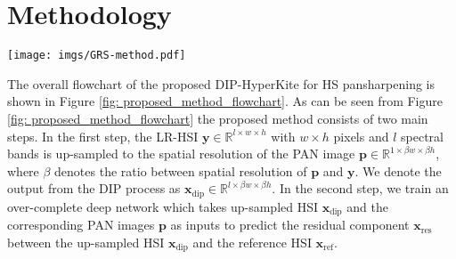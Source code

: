 \documentclass[journal]{IEEEtran}
\begin{document}
\section{Methodology}
\label{sec: method}
\label{proposed_method}
\begin{figure*}[tb!]
        \centering
        \texttt{[image: imgs/GRS-method.pdf]}
        \caption{The overall flowchart of our proposed DIP-HyperKite for HS pansharpening. In the first step, we up-sample the LR-HSI $\mathbf{y}$ via DIP process to obtain the up-sampled HSI $\mathbf{x}_{\text{dip}}$. The DIP process takes a fixed noise tensor $\mathbf{z}$ as input for a given LR-HSI $\mathbf{y}$, and produces the up-sampled HSI $\mathbf{x}_{\text{dip}}$ by optimizing the proposed spatial+spectral energy function $Q_{\text{ss}}$ over the DIP network parameters $\theta$. In the second step, we take the up-sampled HSI $\mathbf{x}_{\text{dip}}$ and the PAN image $\mathbf{p}$ as inputs to predict the residual component $\mathbf{x}_{\text{res}}$ using our proposed over-complete network - HyperKite. Finally, the predicted residual image $\mathbf{x}_{\text{res}}$ is added to the up-sampled HSI $\mathbf{x}_{\text{dip}}$ to obtain the pansharpened HSI $\mathbf{x}$.} 
        \label{fig: proposed_method_flowchart}
    \end{figure*}
    \par The overall flowchart of the proposed DIP-HyperKite for HS pansharpening is shown in Figure \ref{fig: proposed_method_flowchart}. As can be seen from Figure \ref{fig: proposed_method_flowchart} the proposed method consists of two main steps. In the first step, the LR-HSI $\mathbf{y} \in \mathbb{R}^{l \times w \times h}$ with $w \times h$ pixels and $l$ spectral bands is up-sampled to the spatial resolution of the PAN image $\mathbf{p} \in \mathbb{R}^{1 \times \beta w \times \beta h}$, where $\beta$ denotes the ratio between spatial resolution of $\mathbf{p}$ and $\mathbf{y}$. We denote the output from the DIP process as $\mathbf{x}_{\text{dip}} \in \mathbb{R}^{l \times \beta w \times \beta h}$. In the second step, we train an over-complete deep network which takes up-sampled HSI $\mathbf{x}_{\text{dip}}$ and the corresponding PAN images $\mathbf{p}$ as inputs to predict the residual component $\mathbf{x}_{\text{res}}$ between the up-sampled HSI $\mathbf{x}_{\text{dip}}$ and the reference HSI $\mathbf{x}_{\text{ref}}$. 

    
\end{document}
